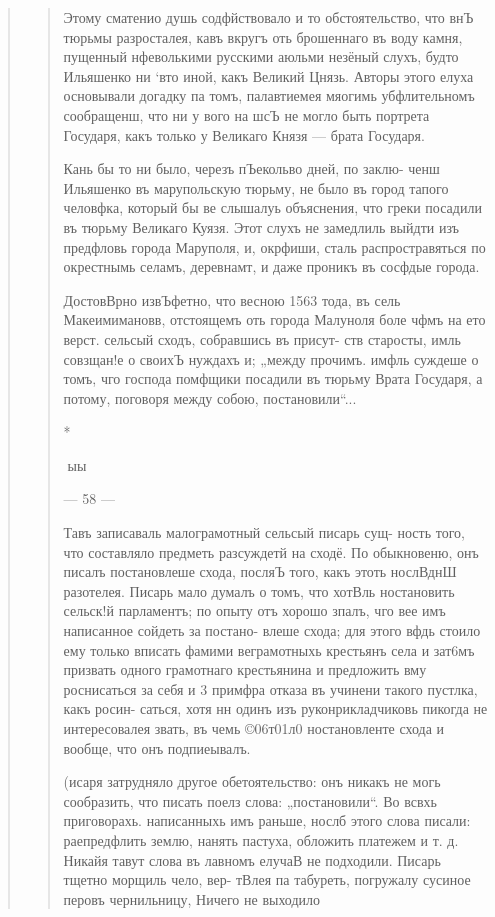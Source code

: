 \begin{quote}
\begin{quote}
Этому сматенио душь содфйствовало и то обстоятельство,
что внЪ тюрьмы разросталея, кавъ вкругъ оть брошеннаго
въ воду камня, пущенный нфеволькими русскими аюльми
незёный слухъ, будто Ильяшенко ни ‘вто иной, какъ Великий
Цнязь. Авторы этого елуха основывали догадку па томъ,
палавтиемея мяогимь убфлительномъ сообращенш, что ни у
вого на шсЪ не могло быть портрета Государя, какъ только
у Великаго Князя — брата Государя.

Кань бы то ни было, черезъ пЪекольво дней, по заклю-
ченш Ильяшенко въ марупольскую тюрьму, не было въ
город тапого человфка, который бы ве слышалуь объяснения,
что греки посадили въ тюрьму Великаго Куязя. Этот слухъ
не замедлиль выйдти изъ предфловь города Маруполя, и,
окрфиши, сталь распростравяться по окрестнымь селамъ,
деревнамт, и даже проникъ въ сосфдые города.

ДостовВрно извЪфетно, что весною 1563 тода, въ сель
Макеимимановв, отстоящемъ оть города Малуноля боле
чфмъ на ето верст. сельсый сходъ, собравшись въ присут-
ств старосты, имль совзщан!е о своихЪ нуждахъ и; „между
прочимъ. имфль суждеше о томъ, чго господа помфщики
посадили въ тюрьму Врата Государя, а потому, поговоря
между собою, постановили“...

*

ыы

— 58 —

Тавъ записаваль малограмотный сельсый писарь сущ-
ность того, что составляло предметь разсуждетй на сходё.
По обыкновеню, онъ писалъ постановлеше схода, посляЪ того,
какъ этоть нослВднШ разотелея. Писарь мало думалъ о томъ,
что хотВль ностановить сельск!й парламентъ; по опыту отъ
хорошо зпалъ, чго вее имъ написанное сойдеть за постано-
влеше схода; для этого вфдь стоило ему только вписать
фамими веграмотныхь крестьянъ села и зат6мъ призвать
одного грамотнаго крестьянина и предложить вму роснисаться
за себя и 3%
примфра отказа въ учинени такого пустлка, какъ росин-
саться, хотя нн одинъ изъ руконрикладчиковь пикогда не
интересовалея звать, въ чемь ©06т01л0 ностановленте схода
и вообще, что онъ подпиеывалъ.

(исаря затрудняло другое обетоятельство: онъ никакъ
не могь сообразить, что писать поелз слова: „постановили“.
Во всвхь приговорахь. написанныхь имъ раньше, нослб
этого слова писали: раепредфлить землю, нанять пастуха,
обложить платежем и т. д. Никайя тавут слова въ лавномъ
елучаВ не подходили. Писарь тщетно морщиль чело, вер-
тВлея па табуреть, погружалу сусиное перовъ чернильницу,
Ничего не выходило


\end{quote}
\end{quote}
